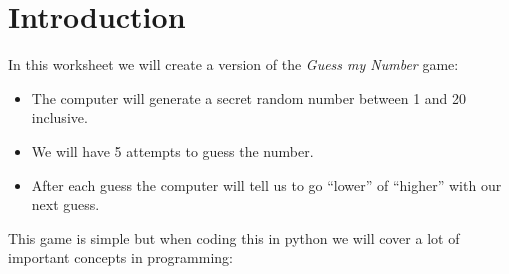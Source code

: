 \documentclass{coderdojo}
\begin{document}
\maketitle

\section*{Introduction}

In this worksheet we will create a version of the {\em Guess my Number \/} game:
\begin{exercise}[title=Guess my Number]

\begin{itemize}
\item
The computer will generate a secret random number between 1 and 20 inclusive.
\item
We will have 5 attempts to guess the number.
\item 
After each guess the computer will tell us to go ``lower'' of ``higher'' with our next guess.
\end{itemize}
\end{exercise}

This game is simple but when coding this in python we will cover a lot of important concepts in programming: 
\end{document}
